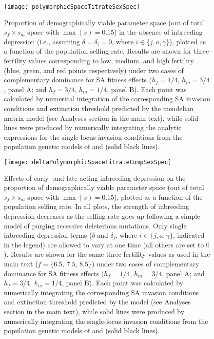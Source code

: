 \documentclass[11pt]{article}
\begin{document}
 \begin{figure}[htbp]
 \centering
 \texttt{[image: polymorphicSpaceTitrateSexSpec]}
 \caption{\footnotesize{Proportion of demographically viable parameter space (out of total $s_f \times s_m$ space with $\max(s) = 0.15$) in the absence of inbreeding depression (i.e., assuming $\delta = \delta_i = 0$, where $i \in \{j,a,\gamma\}$), plotted as a function of the population selfing rate. Results are shown for three fertility values corresponding to low, medium, and high fertility (blue, green, and red points respectively) under two cases of complementary dominance for  SA fitness effects ($h_f = 1/4$, $h_m = 3/4$, panel A; and $h_f = 3/4$, $h_m = 1/4$, panel B). Each point was calculated by numerical integration of the corresponding SA invasion conditions and extinction threshold predicted by the mendelian matrix model (see Analyses section in the main text), while solid lines were produced by numerically integrating the analytic expressions for the single-locus invasion conditions from the population genetic models of \citet{JordanConnallon2014} and \citet{Olito2017} (solid black lines).}} 
 \label{fig:polySpaceCompSexSPec}
 \end{figure}

 \begin{figure}[htbp]
 \centering
 \texttt{[image: deltaPolymorphicSpaceTitrateCompSexSpec]}
 \caption{\footnotesize{Effects of early- and late-acting inbreeding depression on the proportion of demographically viable parameter space (out of total $s_f \times s_m$ space with $\max(s) = 0.15$), plotted as a function of the population selfing rate. In all plots, the strength of inbreeding depression decreases as the selfing rate goes up following a simple model of purging recessive deleterious mutations. Only single inbreeding depression terms ($\delta$ and $\delta_i$, where $i \in \{j,a,\gamma\}$, indicated in the legend) are allowed to vary at one time (all others are set to $0$). Results are shown for the same three fertility values as used in the main text ($f = \{6.5,\,7.5,\,8.5\}$) under two cases of complementary dominance for  SA fitness effects ($h_f = 1/4$, $h_m = 3/4$, panel A; and $h_f = 3/4$, $h_m = 1/4$, panel B). Each point was calculated by numerically integrating the corresponding SA invasion conditions and extinction threshold predicted by the model (see Analyses section in the main text), while solid lines were produced by numerically integrating the single-locus invasion conditions from the population genetic models of \citet{JordanConnallon2014} and \citet{Olito2017} (solid black lines).}} 
  \label{fig:deltaPolySpaceCompSexSpec}
  \end{figure}



%
\newpage{}

\end{document}
